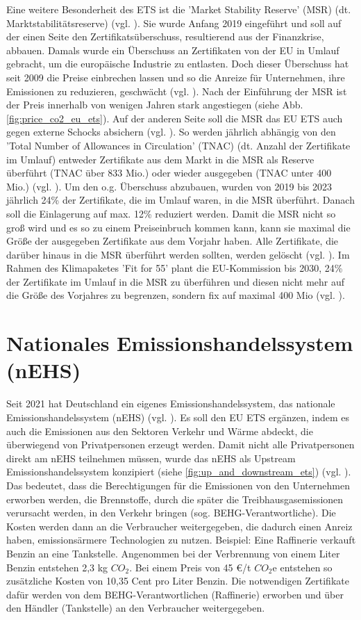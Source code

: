 Eine weitere Besonderheit des ETS ist die 'Market Stability Reserve' (MSR) (dt. Marktstabilitätsreserve) (vgl. \cite{eu3.2023}). Sie wurde Anfang 2019 eingeführt und soll auf der einen Seite den Zertifikatsüberschuss, resultierend aus der Finanzkrise, abbauen.
Damals wurde ein Überschuss an Zertifikaten von der EU in Umlauf gebracht, um die europäische Industrie zu entlasten.
Doch dieser Überschuss hat seit 2009 die Preise einbrechen lassen und so die Anreize für Unternehmen, ihre Emissionen zu reduzieren, geschwächt (vgl. \cite{eu3.2023}). Nach der Einführung der MSR ist der Preis innerhalb von wenigen Jahren stark angestiegen (siehe Abb. \ref{fig:price_co2_eu_ets}).
Auf der anderen Seite soll die MSR das EU ETS auch gegen externe Schocks absichern (vgl. \cite{eu3.2023}).
So werden jährlich abhängig von den 'Total Number of Allowances in Circulation' (TNAC) (dt. Anzahl der Zertifikate im Umlauf) entweder Zertifikate aus dem Markt in die MSR als Reserve überführt (TNAC über 833 Mio.) oder wieder ausgegeben (TNAC unter 400 Mio.) (vgl. \cite[S. 7]{icap2.2023}).
Um den o.g. Überschuss abzubauen, wurden von 2019 bis 2023 jährlich 24\% der Zertifikate, die im Umlauf waren, in die MSR überführt.
Danach soll die Einlagerung auf max. 12\% reduziert werden. Damit die MSR nicht so groß wird und es so zu einem Preiseinbruch kommen kann, kann sie maximal die Größe der ausgegeben Zertifikate aus dem Vorjahr haben.
Alle Zertifikate, die darüber hinaus in die MSR überführt werden sollten, werden gelöscht (vgl. \cite{eu3.2023}).
Im Rahmen des Klimapaketes 'Fit for 55' plant die EU-Kommission bis 2030, 24\% der Zertifikate im Umlauf in die MSR zu überführen und diesen nicht mehr auf die Größe des Vorjahres zu begrenzen, sondern fix auf maximal 400 Mio (vgl. \cite{ub.2023}).

\section{Nationales Emissionshandelssystem (nEHS)}

Seit 2021 hat Deutschland ein eigenes Emissionshandelssystem, das nationale Emissionshandelssystem (nEHS) (vgl. \cite{dehst.2023}). Es soll den EU ETS ergänzen, indem es auch die Emissionen aus den Sektoren Verkehr und Wärme abdeckt, die überwiegend von Privatpersonen erzeugt werden.
Damit nicht alle Privatpersonen direkt am nEHS teilnehmen müssen, wurde das nEHS als Upstream Emissionshandelssystem konzipiert (siehe \ref{fig:up_and_downstream_ets}) (vgl. \cite{dehst.2023}).
Das bedeutet, dass die Berechtigungen für die Emissionen von den Unternehmen erworben werden, die Brennstoffe, durch die später die Treibhausgasemissionen verursacht werden, in den Verkehr bringen (sog. BEHG-Verantwortliche).
Die Kosten werden dann an die Verbraucher weitergegeben, die dadurch einen Anreiz haben, emissionsärmere Technologien zu nutzen. Beispiel: Eine Raffinerie verkauft Benzin an eine Tankstelle.
Angenommen bei der Verbrennung von einem Liter Benzin entstehen 2,3 kg $CO_2$. Bei einem Preis von 45 €/t $CO_2$e entstehen so zusätzliche Kosten von 10,35 Cent pro Liter Benzin.
Die notwendigen Zertifikate dafür werden von dem BEHG-Verantwortlichen (Raffinerie) erworben und über den Händler (Tankstelle) an den Verbraucher weitergegeben.

